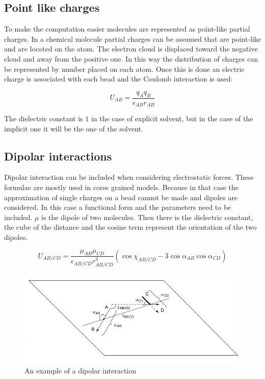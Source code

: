 	\subsection{Point like charges}
	To make the computation easier molecules are represented as point-like partial charges.
	In a chemical molecule partial charges can be assumed that are point-like and are located on the atom.
	The electron cloud is displaced toward the negative cloud and away from the positive one.
	In this way the distribution of charges can be represented by number placed on each atom.
	Once this is done an electric charge is associated with each bead and the Coulomb interaction is used:

	$$U_{AB} = \frac{q_Aq_B}{\epsilon_{AB}r_{AB}}$$

	The dielectric constant is $1$ in the case of explicit solvent, but in the case of the implicit one it will be the one of the solvent.

	\subsection{Dipolar interactions}
	Dipolar interaction can be included when considering electrostatic forces.
	These formulae are mostly used in corse grained models.
	Because in that case the approximation of single charges on a bead cannot be made and dipoles are considered.
	In this case a functional form and the parameters need to be included.
	$\mu$ is the dipole of two molecules.
	Then there is the dielectric constant, the cube of the distance and the cosine term represent the orientation of the two dipoles.

	$$U_{AB/CD} = \frac{\mu_{AB}\mu_{CD}}{\epsilon_{AB/CD}r^3_{AB/CD}}(\cos\chi_{AB/CD}-3\cos\alpha_{AB}\cos\alpha_{CD})$$

	\begin{figure}[H]
		\includegraphics[width=\textwidth]{dipolar-interactions}
		\caption{An example of a dipolar interaction}
		\label{fig:dipolar-interactions}
	\end{figure}

